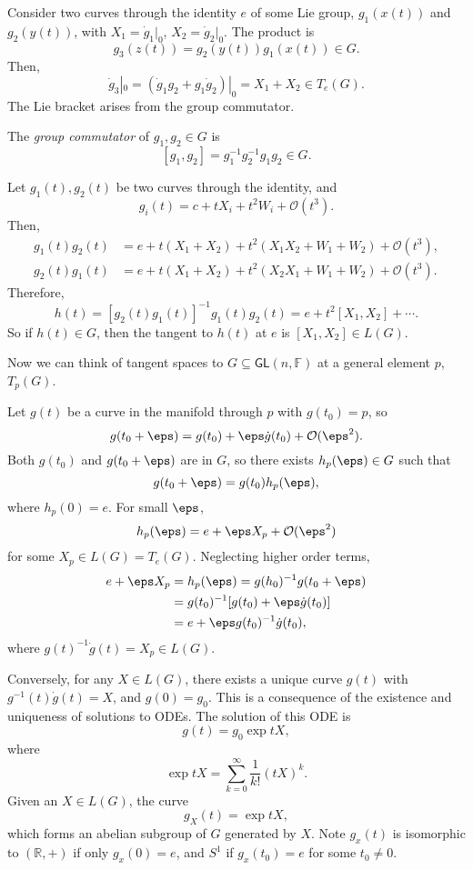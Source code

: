 \documentclass[12pt]{article}
\begin{document}
Consider two curves through the identity $e$ of some Lie group, $g_1(x(t))$ and $g_2(y(t))$, with $X_1 = \dot g_1|_0$, $X_2 = \dot g_2|_0$. The product is
\[
g_3(z(t)) = g_2(y(t)) g_1(x(t)) \in G.
\]
Then,
\[
\dot g_3|_0 = (\dot g_1 g_2 + g_1 \dot g_2)|_0 = X_1 + X_2 \in T_e(G).
\]
The Lie bracket arises from the group commutator.

\begin{definition}
	The \emph{group commutator} of $g_1, g_2 \in G$ is
	\[
		[g_1, g_2] = g_1^{-1} g_2^{-1} g_1 g_2 \in G.
	\]
\end{definition}

Let $g_1(t), g_2(t)$ be two curves through the identity, and
\[
g_i(t) = c + t X_i + t^2 W_i + \mathcal{O}(t^3).
\]
Then,
\begin{align*}
	g_1(t) g_2(t) &= e + t(X_1 + X_2) + t^2(X_1 X_2 + W_1 + W_2) + \mathcal{O}(t^3), \\
	g_2(t) g_1(t) &= e + t(X_1 + X_2) + t^2(X_2 X_1 + W_1 + W_2) + \mathcal{O}(t^3).
\end{align*}
Therefore,
\[
	h(t) = [g_2(t)g_1(t)]^{-1} g_1(t) g_2(t) = e + t^2[X_1, X_2] + \cdots.
\]
So if $h(t) \in G$, then the tangent to $h(t)$ at $e$ is $[X_1, X_2] \in L(G)$.

Now we can think of tangent spaces to $G \subseteq \mathsf{GL}(n, \mathbb{F})$ at a general element $p$, $T_p(G)$.

Let $g(t)$ be a curve in the manifold through $p$ with $g(t_0) = p$, so
\[
g(t_0 + \eps) = g(t_0) + \eps \dot g (t_0) + \mathcal{O}(\eps^2).
\]
Both $g(t_0)$ and $g(t_0 + \eps)$ are in $G$, so there exists $h_p(\eps) \in G$ such that
\[
g(t_0 + \eps) = g(t_0) h_p(\eps),
\]
where $h_p(0) = e$. For small $\eps$,
\[
h_p(\eps) = e + \eps X_p + \mathcal{O}(\eps^2)
\]
for some $X_p \in L(G) = T_e(G)$. Neglecting higher order terms,
\begin{align*}
	e + \eps X_p &= h_p(\eps) = g(h_0)^{-1} g(t_0 + \eps) \\
		     &= g(t_0)^{-1} [g(t_0) + \eps \dot g (t_0)] \\
		     &= e + \eps g(t_0)^{-1} \dot g(t_0),
\end{align*}
where $g(t)^{-1} \dot g(t) = X_p \in L(G)$.

Conversely, for any $X \in L(G)$, there exists a unique curve $g(t)$ with $g^{-1}(t) \dot g(t) = X$, and $g(0) = g_0$. This is a consequence of the existence and uniqueness of solutions to ODEs. The solution of this ODE is
\[
g(t) = g_0 \exp tX,
\]
where
\[
\exp tX = \sum_{k = 0}^\infty \frac{1}{k!} (tX)^k.
\]
Given an $X \in L(G)$, the curve
\[
g_X(t) = \exp tX,
\]
which forms an abelian subgroup of $G$ generated by $X$. Note $g_x(t)$ is isomorphic to $(\mathbb{R}, +)$ if only $g_x(0)=  e$, and $S^1$ if $g_x(t_0) = e$ for some $t_0 \neq 0$.
\end{document}
